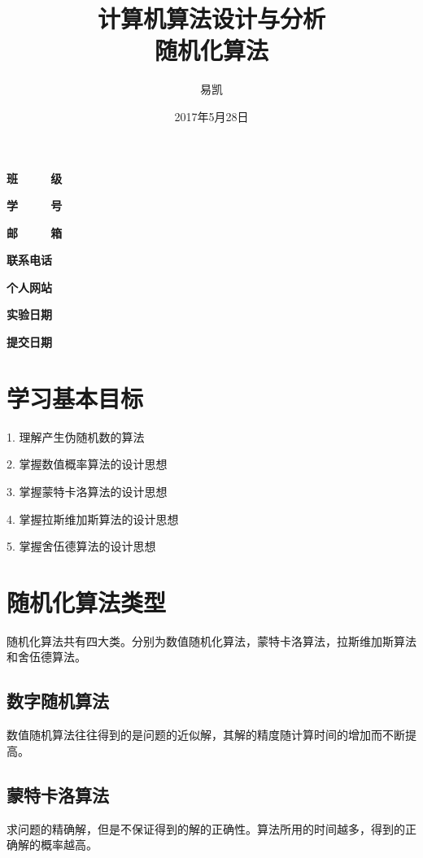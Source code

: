 \documentclass[UTF8]{ctexart}
\title{\Huge{计算机算法设计与分析\\ 随机化算法}}
\author{\Huge{易凯}}
\date{\Huge{2017年5月28日}}
\begin{document}
    \maketitle
    \vspace{35mm}
    \begin{flushright}
    \Large{
    \textbf{班\ \ \ \ \ 级} 

    \textbf{学\ \ \ \ \ 号} 

    \textbf{邮\ \ \ \ \ 箱} 

    \textbf{联系电话} 

    \textbf{个人网站} 


      \textbf{实验日期} 

    \textbf{提交日期} 
    }
    \end{flushright}

    \newpage
  	\tableofcontents
  	\newpage
  	\listoffigures
    \newpage

    \section{学习基本目标}
    1. 理解产生伪随机数的算法

    2. 掌握数值概率算法的设计思想

    3. 掌握蒙特卡洛算法的设计思想

    4. 掌握拉斯维加斯算法的设计思想

    5. 掌握舍伍德算法的设计思想

    \section{随机化算法类型}
    随机化算法共有四大类。分别为数值随机化算法，蒙特卡洛算法，拉斯维加斯算法和舍伍德算法。
    \subsection{数字随机算法}
    数值随机算法往往得到的是问题的近似解，其解的精度随计算时间的增加而不断提高。
    \subsection{蒙特卡洛算法}
    求问题的精确解，但是不保证得到的解的正确性。算法所用的时间越多，得到的正确解的概率越高。
\end{document}
